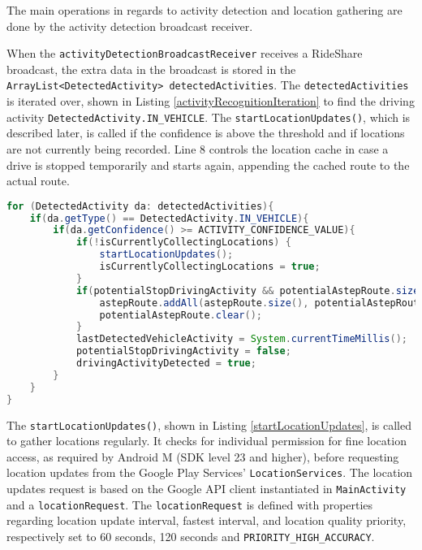 


The main operations in regards to activity detection and location gathering are done by the activity detection broadcast receiver.

When the \texttt{activityDetectionBroadcastReceiver} receives a RideShare broadcast, the extra data in the broadcast is stored in the \texttt{ArrayList<DetectedActivity> detectedActivities}.
The \texttt{detectedActivities} is iterated over, shown in Listing \ref{activityRecognitionIteration} to find the driving activity \texttt{DetectedActivity.IN\_VEHICLE}.
The \texttt{startLocationUpdates()}, which is described later, is called if the confidence is above the threshold and if locations are not currently being recorded.
Line 8 controls the location cache in case a drive is stopped temporarily and starts again, appending the cached route to the actual route.

\begin{lstlisting}[language=Java, label=activityRecognitionIteration, caption=Iteration over received list of activity recognition.]
for (DetectedActivity da: detectedActivities){
	if(da.getType() == DetectedActivity.IN_VEHICLE){
		if(da.getConfidence() >= ACTIVITY_CONFIDENCE_VALUE){
			if(!isCurrentlyCollectingLocations) {
				startLocationUpdates();
				isCurrentlyCollectingLocations = true;
			}
			if(potentialStopDrivingActivity && potentialAstepRoute.size() > 0){
				astepRoute.addAll(astepRoute.size(), potentialAstepRoute);
				potentialAstepRoute.clear();
			}
			lastDetectedVehicleActivity = System.currentTimeMillis();
			potentialStopDrivingActivity = false;
			drivingActivityDetected = true;
		}
	}
}
\end{lstlisting}

The \texttt{startLocationUpdates()}, shown in Listing \ref{startLocationUpdates}, is called to gather locations regularly.
It checks for individual permission for fine location access, as required by Android M (SDK level 23 and higher), before requesting location updates from the Google Play Services' \texttt{LocationServices}.
The location updates request is based on the Google API client instantiated in \texttt{MainActivity} and a \texttt{locationRequest}.
The \texttt{locationRequest} is defined with properties regarding location update interval, fastest interval, and location quality priority, respectively set to  60 seconds, 120 seconds and \texttt{PRIORITY\_HIGH\_ACCURACY}.

